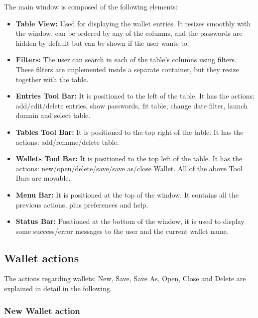 The main window is composed of the following elements:

\begin{itemize}
\setlength\itemsep{-3pt}

\item \textbf{Table View:} Used for displaying the wallet entries. It resizes smoothly with the window, can be ordered by any of the columns, and the passwords are hidden by default but can be shown if the user wants to.
\item \textbf{Filters:} The user can search in each of the table's columns using filters. These filters are implemented inside a separate container, but they resize together with the table.
\item \textbf{Entries Tool Bar:} It is positioned to the left of the table. It has the actions: add/edit/delete entries, show passwords, fit table, change date filter, launch domain and select table.
\item \textbf{Tables Tool Bar:} It is positioned to the top right of the table. It has the actions: add/rename/delete table.
\item \textbf{Wallets Tool Bar:} It is positioned to the top left of the table. It has the actions: new/open/delete/save/save as/close Wallet. 
All of the above Tool Bars are movable.
\item \textbf{Menu Bar:} It is positioned at the top of the window. It contains all the previous actions, plus preferences and help.
\item \textbf{Status Bar:} Positioned at the bottom of the window, it is used to display some success/error messages to the user and the current wallet name.
\end{itemize}

\subsection{Wallet actions}

The actions regarding wallets: New, Save, Save As, Open, Close and Delete are explained in detail in the following.

\subsubsection*{New Wallet action}

